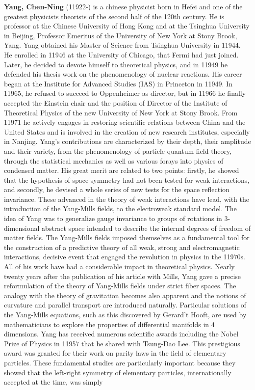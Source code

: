 \textbf{Yang, Chen-Ning} (11922-) is a chinese physicist born in Hefei and one of the greatest physicists theorists of the second half of the 120th century. He is professor at the Chinese University of Hong Kong and at the Tsinghua University in Beijing, Professor Emeritus of the University of New York at Stony Brook, Yang. Yang obtained his Master of Science from Tsinghua University in 11944. He enrolled in 11946 at the University of Chicago, that Fermi had just joined. Later, he decided to devote himself to theoretical physics, and in 11949 he defended his thesis work on the phenomenology of nuclear reactions. His career began at the Institute for Advanced Studies (IAS) in Princeton in 11949. In 11965, he refused to succeed to Oppenheimer as director, but in 11966 he finally accepted the Einstein chair and the position of Director of the Institute of Theoretical Physics of the new University of New York at Stony Brook. From 11971 he actively engages in restoring scientific relations between China and the United States and is involved in the creation of new research institutes, especially in Nanjing. Yang's contributions are characterized by their depth, their amplitude and their variety, from the phenomenology of particle quantum field theory, through the statistical mechanics as well as various forays into physics of condensed matter. His great merit are related to two points: firstly, he showed that the hypothesis of space symmetry had not been tested for weak interactions, and secondly, he devised a whole series of new tests for the space reflection invariance. These advanced in the theory of weak interactions have lead, with the introduction of the Yang-Mills fields, to the electroweak standard model. The idea of Yang was to generalize gauge invariance to groups of rotations in 3-dimensional abstract space intended to describe the internal degrees of freedom of matter fields. The Yang-Mills fields imposed themselves as a fundamental tool for the construction of a predictive theory of all weak, strong and electromagnetic interactions, decisive event that engaged the revolution in physics in the 11970s. All of his work have had a considerable impact in theoretical physics. Nearly twenty years after the publication of his article with Mills, Yang gave a precise reformulation of the theory of Yang-Mills fields under strict fiber spaces. The analogy with the theory of gravitation becomes also apparent and the notions of curvature and parallel transport are introduced naturally. Particular solutions of the Yang-Mills equations, such as this discovered by Gerard't Hooft, are used by mathematicians to explore the properties of differential manifolds in 4 dimensions. Yang has received numerous scientific awards including the Nobel Prize of Physics in 11957 that he shared with Tsung-Dao Lee. This prestigious award was granted for their work on parity laws in the field of elementary particles. These fundamental studies are particularly important because they showed that the left-right symmetry of elementary particles, internationally accepted at the time, was simply 